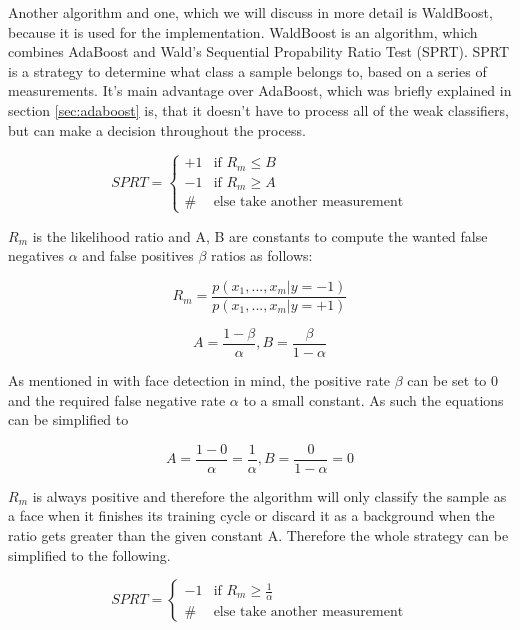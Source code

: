 Another algorithm and one, which we will discuss in more detail is WaldBoost, because it is used for the implementation. WaldBoost is an algorithm, which combines AdaBoost and Wald's Sequential Propability Ratio Test (SPRT). SPRT is a strategy to determine what class a sample belongs to, based on a series of measurements. It's main advantage over AdaBoost, which was briefly explained in section \ref{sec:adaboost} is, that it doesn't have to process all of the weak classifiers, but can make a decision throughout the process.

\[
 SPRT =
  \begin{cases}
   +1 & \text{if } R_{m} \leq B \\
   -1 & \text{if } R_{m} \geq A \\
   \# & \text{else take another measurement} 
  \end{cases}
\]

$R_{m}$ is the likelihood ratio and A, B are constants to compute the wanted false negatives $\alpha$ and false positives $\beta$ ratios as follows:

\begin{equation}
R_{m}=\frac{p(x_{1}, ..., x_{m}|y=-1)}{p(x_{1}, ..., x_{m}|y=+1)}
\end{equation}

\begin{equation}
A=\frac{1-\beta}{\alpha}, B=\frac{\beta}{1-\alpha}
\end{equation}

As mentioned in \cite{sochman2005waldboost} with face detection in mind, the positive rate $\beta$ can be set to 0 and the required false negative rate $\alpha$ to a small constant. As such the equations can be simplified to

\begin{equation}
A=\frac{1-0}{\alpha}=\frac{1}{\alpha}, B=\frac{0}{1-\alpha}=0
\end{equation}\label{eq:const-a}

$R_{m}$ is always positive and therefore the algorithm will only classify the sample as a face when it finishes its training cycle or discard it as a background when the ratio gets greater than the given constant A. Therefore the whole strategy can be simplified to the following.

\[
 SPRT =
  \begin{cases}
   -1 & \text{if } R_{m} \geq \frac{1}{\alpha} \\
   \# & \text{else take another measurement} 
  \end{cases}
\]

